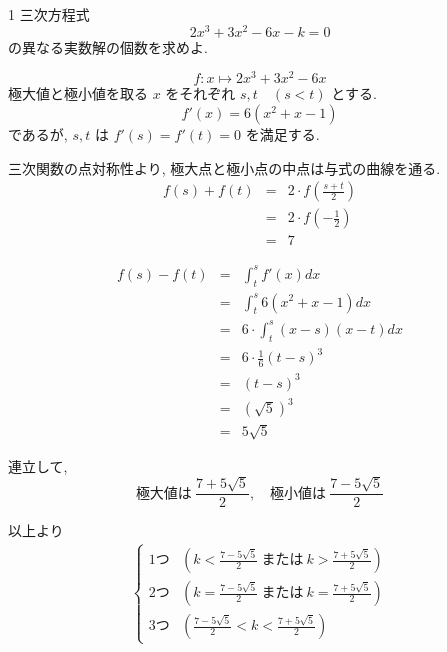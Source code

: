 \documentclass[uplatex,b5paper]{jsarticle}
\begin{document}
\begin{prob}1
  三次方程式
  \[2x^3+3x^2-6x-k=0\]
  の異なる実数解の個数を求めよ.

  \vspace{2cm}
  \[f: x \mapsto 2x^3+3x^2-6x\]
  極大値と極小値を取る \(x\) をそれぞれ \(s,t\quad(s<t)\) とする.
  \[f'(x)=6(x^2+x-1)\]
  であるが, \(s,t\) は \(f'(s)=f'(t)=0\) を満足する.

  三次関数の点対称性より,
  極大点と極小点の中点は与式の曲線を通る.
  \begin{eqnarray*}
    f(s)+f(t) &=& 2\cdot f\left(\frac{s+t}2\right)\\
              &=& 2\cdot f\left(-\frac12\right)\\
              &=& 7
  \end{eqnarray*}

  \begin{eqnarray*}
    f(s)-f(t) &=& \int_t^sf'(x)dx\\
              &=& \int_t^s6(x^2+x-1)dx\\
              &=& 6\cdot\int_t^s(x-s)(x-t)dx\\
              &=& 6\cdot\frac16(t-s)^3\\
              &=& (t-s)^3\\
              &=& \left(\sqrt5\right)^3\\
              &=& 5\sqrt5
  \end{eqnarray*}

  連立して,
  \[\text{極大値は}\ \frac{7+5\sqrt5}2,\quad\text{極小値は}\ \frac{7-5\sqrt5}2\]

  以上より
  \begin{eqnarray*}
      \begin{cases}
        \text{1つ} &\left(\displaystyle k<\frac{7-5\sqrt5}2\ \text{または}\ k>\frac{7+5\sqrt5}2 \right)\\
        \text{2つ} &\left(\displaystyle k=\frac{7-5\sqrt5}2\ \text{または}\ k=\frac{7+5\sqrt5}2 \right)\\
        \text{3つ} & \left(\displaystyle \frac{7-5\sqrt5}2<k<\frac{7+5\sqrt5}2 \right)
      \end{cases}
  \end{eqnarray*}

\end{prob}
\end{document}
